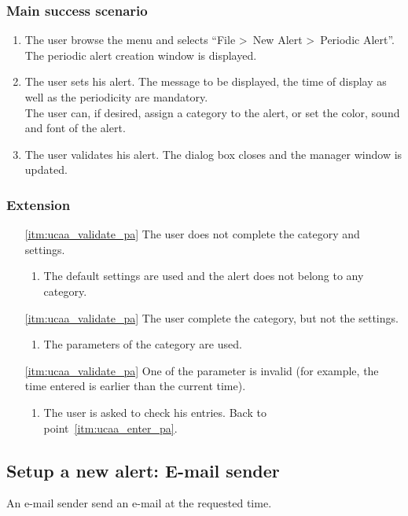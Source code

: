 \subsubsection{Main success scenario}
\begin{enumerate}
	\item The user browse the menu and selects ``File \textgreater~New Alert \textgreater~Periodic Alert''. The periodic alert creation window is displayed. 
	\item\label{itm:ucaa_enter_pa} The user sets his alert. The message to be displayed, the time of display as well as the periodicity are mandatory. \\The user can, if desired, assign a category to the alert, or set the color, sound and font of the alert.
	\item\label{itm:ucaa_validate_pa} The user validates his alert. The dialog box closes and the manager window is updated.
\end{enumerate}
\subsubsection{Extension}
\begin{enumerate}
	\item[\ref{itm:ucaa_validate_pa}] The user does not complete the category and settings.
	\begin{enumerate}[i]
		\item The default settings are used and the alert does not belong to any category.
	\end{enumerate}
	\item[\ref{itm:ucaa_validate_pa}] The user complete the category, but not the settings.
	\begin{enumerate}[i]
		\item The parameters of the category are used.
	\end{enumerate}
	\item[\ref{itm:ucaa_validate_pa}] One of the parameter is invalid (for example, the time entered is earlier than the current time).
	\begin{enumerate}[i]
		\item The user is asked to check his entries. Back to point~\ref{itm:ucaa_enter_pa}.
	\end{enumerate}
\end{enumerate}

\subsection{Setup a new alert: E-mail sender}\label{subsec:usecase_add_email_sender}
An e-mail sender send an e-mail at the requested time.
